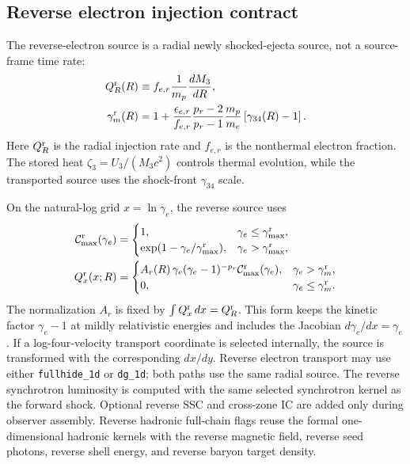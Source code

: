 \documentclass[twocolumn]{aastex702}
\begin{document}
\subsection{Reverse electron injection contract}

The reverse-electron source is a radial newly shocked-ejecta source, not a
source-frame time rate:
\begin{equation}
\begin{aligned}
Q_R^{\rm r}(R)&\equiv
f_{e,r}\frac{1}{m_p}\frac{dM_3}{dR},\\
\gamma_m^{\rm r}(R)&=1+
\frac{\epsilon_{e,r}}{f_{e,r}}
\frac{p_r-2}{p_r-1}
\frac{m_p}{m_e}\left[\gamma_{34}(R)-1\right].
\end{aligned}
\end{equation}
Here \(Q_R^{\rm r}\) is the radial injection rate and \(f_{e,r}\) is the
nonthermal electron fraction.  The stored heat \(\zeta_3=U_3/(M_3c^2)\) controls
thermal evolution, while the transported source uses the shock-front
\(\gamma_{34}\) scale.

On the natural-log grid \(x=\ln\gamma_e\), the reverse source uses
\begin{equation}
\begin{aligned}
\mathcal C_{\max}^{\rm r}(\gamma_e)&=
\begin{cases}
1, & \gamma_e\le\gamma_{\max}^{\rm r},\\
\exp(1-\gamma_e/\gamma_{\max}^{\rm r}),&
\gamma_e>\gamma_{\max}^{\rm r},
\end{cases}\\
Q_x^{\rm r}(x;R)&=
\begin{cases}
A_r(R)\,\gamma_e(\gamma_e-1)^{-p_r}
\mathcal C_{\max}^{\rm r}(\gamma_e),
& \gamma_e>\gamma_m^{\rm r},\\
0, & \gamma_e\le\gamma_m^{\rm r}.
\end{cases}
\end{aligned}
\end{equation}
The normalization \(A_r\) is fixed by
\(\int Q_x^{\rm r}\,dx=Q_R^{\rm r}\).  This form keeps the kinetic factor
\(\gamma_e-1\) at mildly relativistic energies and includes the Jacobian
\(d\gamma_e/dx=\gamma_e\).  If a log-four-velocity transport coordinate is
selected internally, the source is transformed with the corresponding
\(dx/dy\).  Reverse electron transport may use either \texttt{fullhide\_1d} or
\texttt{dg\_1d}; both paths use the same radial source.  The reverse
synchrotron luminosity is computed with the same selected synchrotron kernel as
the forward shock.  Optional reverse SSC and cross-zone IC are added only during
observer assembly.  Reverse hadronic full-chain flags reuse the formal
one-dimensional hadronic kernels with the reverse magnetic field, reverse seed
photons, reverse shell energy, and reverse baryon target density.
\end{document}

